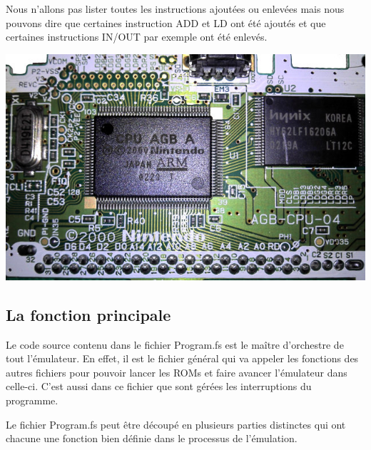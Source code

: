 \documentclass[12pt, a4paper]{article}
\begin{document}
Nous n'allons pas lister toutes les instructions ajoutées ou enlevées mais nous pouvons dire que certaines instruction ADD et LD ont été ajoutés et que certaines instructions IN/OUT par exemple ont été enlevés.

\begin{center}
\includegraphics[width = 15 cm]{proc.png} 
\end{center}

\pagebreak

\subsection{La fonction principale}

Le code source contenu dans le fichier Program.fs est le maître d'orchestre de tout l'émulateur. En effet, il est le fichier général qui va appeler les fonctions des autres fichiers pour pouvoir lancer les ROMs et faire avancer l'émulateur dans celle-ci. C'est aussi dans ce fichier que sont gérées les interruptions du programme.
\bigskip



Le fichier Program.fs peut être découpé en plusieurs parties distinctes qui ont chacune une fonction bien définie dans le processus de l'émulation.
\bigskip
\end{document}
